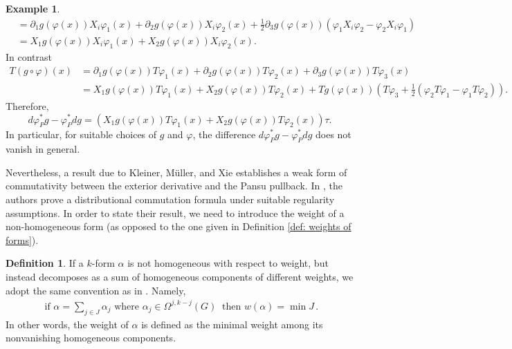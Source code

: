 \documentclass[dvipsnames]{amsart}
\theoremstyle{definition}
\newtheorem{definition}[theorem]{Definition}
\newtheorem{example}[theorem]{Example}
\theoremstyle{definition}
\numberwithin{equation}{section}
\begin{document}
\begin{example}
\begin{align*}
    &= \partial_1g(\varphi(x))X_i\varphi_1(x)+\partial_2g(\varphi(x)) X_i\varphi_2(x) + \frac{1}{2}\partial_3g(\varphi(x))\left ( \varphi_1 X_i\varphi_2 - \varphi_2 X_i\varphi_1 \right )\\
    &= X_1g(\varphi(x))X_i\varphi_1(x)+X_2g(\varphi(x)) X_i\varphi_2(x).
\end{align*}
In contrast
\begin{align*}
    T(g \circ \varphi)(x) &= \partial_1g(\varphi(x)) T\varphi_1(x)+\partial_2g(\varphi(x)) T\varphi_2(x)+\partial_3g(\varphi(x)) T\varphi_3(x)\\ 
    &= X_1g(\varphi(x))T\varphi_1(x)+X_2g(\varphi(x)) T\varphi_2(x) + Tg(\varphi(x))\left( T\varphi_3 + \frac{1}{2}(\varphi_2 T\varphi_1 - \varphi_1 T\varphi_2) \right).
\end{align*}
Therefore,
\begin{equation*}
      d \varphi_P^* g - \varphi_P^* dg = \left(X_1g(\varphi(x))T\varphi_1(x)+X_2g(\varphi(x)) T\varphi_2(x)\right) \tau.
\end{equation*}
In particular, for suitable choices of $g$ and $\varphi$, the difference $d \varphi_P^* g - \varphi_P^* dg $ does not vanish in general.
\end{example}

Nevertheless, a result due to Kleiner, Müller, and Xie establishes a weak form of commutativity between the exterior derivative and the Pansu pullback. In \cite{kleiner2020pansu}, the authors prove a distributional commutation formula under suitable regularity assumptions. In order to state their result, we need to introduce the weight of a non-homogeneous form (as opposed to the one given in Definition \ref{def: weights of forms}).
\begin{definition}
    If a $k$-form $\alpha$ is not homogeneous with respect to weight, but instead decomposes as a sum of homogeneous components of different weights, we adopt the same convention as in \cite{kleiner2020pansu}. Namely,
     \begin{align*}
         \text{ if }\alpha=\sum_{j\in J}\alpha_j \text{ where }\alpha_j\in\Omega^{j,k-j}(G)\ \text{ then }w(\alpha)=\min J\,.
     \end{align*}
     In other words, the weight of $\alpha$ is defined as the minimal weight among its nonvanishing homogeneous components.
\end{definition}
\end{document}
